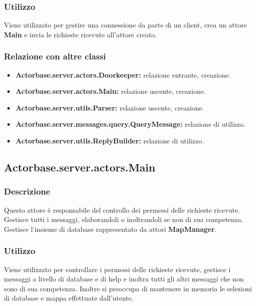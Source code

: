 \documentclass[a4paper]{article}
\begin{document}
			\subsubsection{Utilizzo}
				Viene utilizzato per gestire una connessione da parte di un client, crea un attore \textbf{Main} e invia le richieste 
				ricevute all'attore creato. 
				
			\subsubsection{Relazione con altre classi}
				\begin{itemize}
					\item \textbf{Actorbase.server.actors.Doorkeeper:} relazione entrante, creazione.
					\item \textbf{Actorbase.server.actors.Main:} relazione uscente, creazione.
					\item \textbf{Actorbase.server.utils.Parser:} relazione uscente, creazione.
					\item \textbf{Actorbase.server.messages.query.QueryMessage:} relazione di utilizzo.
					\item \textbf{Actorbase.server.utils.ReplyBuilder:} relazione di utilizzo.
				\end{itemize}
				
		\subsection{Actorbase.server.actors.Main}
			\subsubsection{Descrizione}
				Questo attore è responsabile del controllo dei permessi delle richieste ricevute. Gestisce tutti i messaggi, elaborandoli o inoltrandoli 
				se non di sua competenza. Gestisce  l'insieme di database rappresentato da attori \textbf{MapManager}.
				
			\subsubsection{Utilizzo}
				Viene utilizzato per controllare i permessi delle richieste ricevute, gestisce i messaggi a livello di database e di help
				 e inoltra tutti gli altri messaggi che non sono di sua competenza. Inoltre si preoccupa di mantenere in memoria le selezioni di 
				 database e mappa effettuate dall'utente.
				
\end{document}
